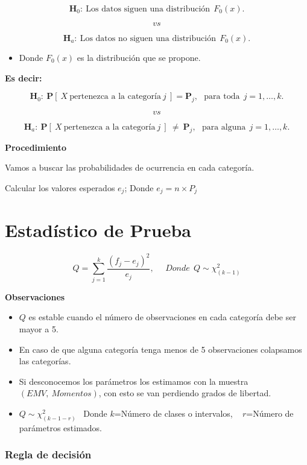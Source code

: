 \documentclass[
  a4paper,
  oneside,
  openany]{book}
\providecommand{\tightlist}{%
  \setlength{\itemsep}{0pt}\setlength{\parskip}{0pt}}
\begin{document}
\[\textbf{H}_0: \ \mbox{Los datos siguen una distribución} \ \  F_{0}(x).\]

\[vs\]

\[\textbf{H}_a: \ \mbox{Los datos no siguen una distribución} \ \ F_{0}(x).\]

\begin{itemize}
\tightlist
\item
  Donde \(F_{0}(x)\) es la distribución que se propone.
\end{itemize}

\textbf{Es decir:}

\[\textbf{H}_0: \ \mathbf{P}[\ X \ \mbox{pertenezca a la categoría} \ j \ ] = \mathbf{P}_{j},\ \ \ \mbox{para toda} \ \  j=1,\ldots,k.\]

\[vs\]

\[\textbf{H}_a: \ \mathbf{P}[ \ X \ \mbox{pertenezca a la categoría} \ j \ ] \  \neq \  \mathbf{P}_{j}, \ \ \ \mbox{para alguna} \ \ j=1,\ldots,k.\]

\textbf{Procedimiento}

Vamos a buscar las probabilidades de ocurrencia en cada categoría.

Calcular los valores esperados \(e_{j}\); Donde \(e_{j}=n \times P_{j}\)

\hypertarget{estaduxedstico-de-prueba-13}{%
\section{Estadístico de Prueba}\label{estaduxedstico-de-prueba-13}}

\[Q= \sum_{j=1}^{k}\frac{(f_{j}-e_{j})^2}{e_{j}}, \ \ \ \ \ \ Donde\ \ Q \sim \chi^2_{(k-1)}\]

\textbf{Observaciones}

\begin{itemize}
\item
  \(Q\) es estable cuando el número de observaciones en cada categoría debe ser mayor a 5.
\item
  En caso de que alguna categoría tenga menos de 5 observaciones colapsamos las categorías.
\item
  Si desconocemos los parámetros los estimamos con la muestra \((EMV,\  Momentos)\), con esto se van perdiendo grados de libertad.
\item
  \(Q \sim \chi^2_{(k-1-r)}\) ~Donde \(k\)=Número de clases o intervalos, ~ \(r\)=Número de parámetros estimados.
\end{itemize}

\hypertarget{regla-de-decisiuxf3n-27}{%
\subsubsection*{Regla de decisión}\label{regla-de-decisiuxf3n-27}}
\end{document}
